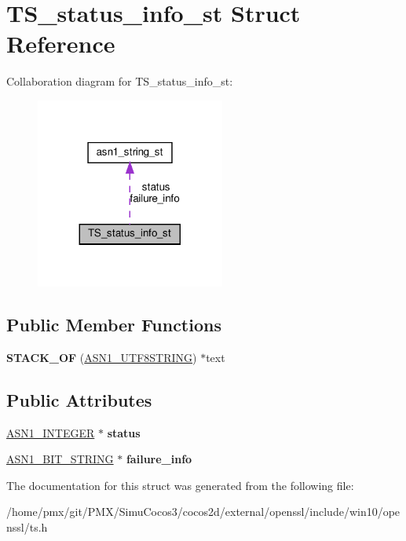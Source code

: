 \hypertarget{structTS__status__info__st}{}\section{T\+S\+\_\+status\+\_\+info\+\_\+st Struct Reference}
\label{structTS__status__info__st}


Collaboration diagram for T\+S\+\_\+status\+\_\+info\+\_\+st\+:
\nopagebreak
\begin{figure}[H]
\begin{center}
\leavevmode
\includegraphics[width=176pt]{structTS__status__info__st__coll__graph}
\end{center}
\end{figure}
\subsection*{Public Member Functions}
\begin{DoxyCompactItemize}
\item 
\mbox{\label{structTS__status__info__st_ac071c90d1bf6dd456780338a417ba9e2}} 
{\bfseries S\+T\+A\+C\+K\+\_\+\+OF} (\hyperlink{structasn1__string__st}{A\+S\+N1\+\_\+\+U\+T\+F8\+S\+T\+R\+I\+NG}) $\ast$text
\end{DoxyCompactItemize}
\subsection*{Public Attributes}
\begin{DoxyCompactItemize}
\item 
\mbox{\label{structTS__status__info__st_a1bbc97b14de94cd43623becfd70a254e}} 
\hyperlink{structasn1__string__st}{A\+S\+N1\+\_\+\+I\+N\+T\+E\+G\+ER} $\ast$ {\bfseries status}
\item 
\mbox{\label{structTS__status__info__st_a20343fe14840039fb382b1b08da0104d}} 
\hyperlink{structasn1__string__st}{A\+S\+N1\+\_\+\+B\+I\+T\+\_\+\+S\+T\+R\+I\+NG} $\ast$ {\bfseries failure\+\_\+info}
\end{DoxyCompactItemize}


The documentation for this struct was generated from the following file\+:\begin{DoxyCompactItemize}
\item 
/home/pmx/git/\+P\+M\+X/\+Simu\+Cocos3/cocos2d/external/openssl/include/win10/openssl/ts.\+h\end{DoxyCompactItemize}
